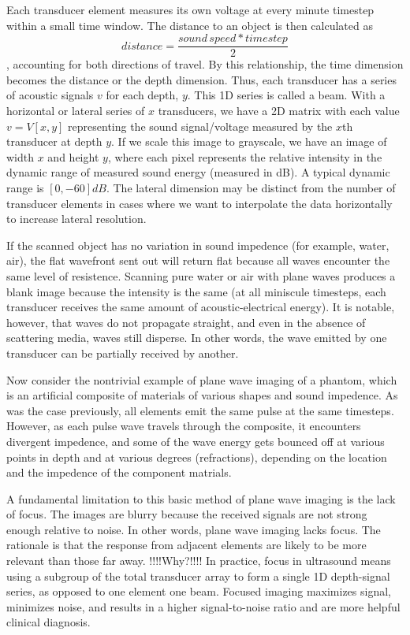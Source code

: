 
 Each transducer element measures its own voltage at every minute timestep within a small time window. The distance to an object is then calculated as $$distance = \frac{sound\,speed * timestep}{2}$$, accounting for both directions of travel. By this relationship, the time dimension becomes the distance or the depth dimension. Thus, each transducer has a series of acoustic signals $v$ for each depth, $y$. This 1D series is called a beam. With a horizontal or lateral series of $x$ transducers, we have a 2D matrix with each value $v = V[x, y]$ representing the sound signal/voltage measured by the $x$th transducer at depth $y$. If we scale this image to grayscale, we have an image of width $x$ and height $y$, where each pixel represents the relative intensity in the dynamic range of measured sound energy (measured in dB). A typical dynamic range is $[0, -60]dB$. The lateral dimension may be distinct from the number of transducer elements in cases where we want to interpolate the data horizontally to increase lateral resolution.

 If the scanned object has no variation in sound impedence (for example, water, air), the flat wavefront sent out will return flat because all waves encounter the same level of resistence. Scanning pure water or air with plane waves produces a blank image because the intensity is the same (at all miniscule timesteps, each transducer receives the same amount of acoustic-electrical energy). It is notable, however, that waves do not propagate straight, and even in the absence of scattering media, waves still disperse. In other words, the wave emitted by one transducer can be partially received by another.

 Now consider the nontrivial example of plane wave imaging of a phantom, which is an artificial composite of materials of various shapes and sound impedence. As was the case previously, all elements emit the same pulse at the same timesteps. However, as each pulse wave travels through the composite, it encounters divergent impedence, and some of the wave energy gets bounced off at various points in depth and at various degrees (refractions), depending on the location and the impedence of the component matrials.

 A fundamental limitation to this basic method of plane wave imaging is the lack of focus. The images are blurry because the received signals are not strong enough relative to noise. In other words, plane wave imaging lacks focus. The rationale is that the response from adjacent elements are likely to be more relevant than those far away. !!!!Why?!!!! In practice, focus in ultrasound means using a subgroup of the total transducer array to form a single 1D depth-signal series, as opposed to one element one beam. Focused imaging maximizes signal, minimizes noise, and results in a higher signal-to-noise ratio and are more helpful clinical diagnosis.

